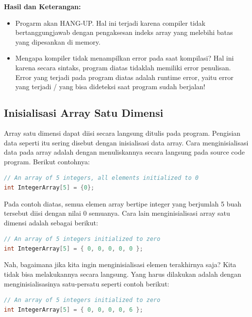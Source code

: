 \textbf{Hasil dan Keterangan:}

\begin{itemize}

\item
  Progarm akan HANG-UP. Hal ini terjadi karena compiler tidak
  bertanggungjawab dengan pengaksesan indeks array yang melebihi batas
  yang dipesankan di memory.
\item
  Mengapa kompiler tidak menampilkan error pada saat kompilasi? Hal ini
  karena secara sintaks, program diatas tidaklah memiliki error
  penulisan. Error yang terjadi pada program diatas adalah runtime
  error, yaitu error yang terjadi / yang bisa dideteksi saat program
  sudah berjalan!
\end{itemize}

\subsection{Inisialisasi Array Satu
Dimensi}\label{inisialisasi-array-satu-dimensi}

Array satu dimensi dapat diisi secara langsung ditulis pada program.
Pengisian data seperti itu sering disebut dengan inisialisasi data
array. Cara menginisialisasi data pada array adalah dengan menuliskannya
secara langsung pada source code program. Berikut contohnya:

\begin{lstlisting}[language=c++, numbers=none]
// An array of 5 integers, all elements initialized to 0
int IntegerArray[5] = {0};
\end{lstlisting}

Pada contoh diatas, semua elemen array bertipe integer yang berjumlah 5
buah tersebut diisi dengan nilai 0 semuanya. Cara lain menginisialisasi
array satu dimensi adalah sebagai berikut:

\begin{lstlisting}[language=c++, numbers=none]
// An array of 5 integers initialized to zero
int IntegerArray[5] = { 0, 0, 0, 0, 0 };
\end{lstlisting}

Nah, bagaimana jika kita ingin menginisialisasi elemen terakhirnya saja?
Kita tidak bisa melakukannya secara langsung. Yang harus dilakukan
adalah dengan menginisialisasinya satu-persatu seperti contoh berikut:

\begin{lstlisting}[language=c++, numbers=none]
// An array of 5 integers initialized to zero
int IntegerArray[5] = { 0, 0, 0, 0, 6 };
\end{lstlisting}

